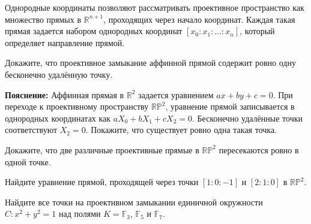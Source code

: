     \begin{statement}
    Однородные координаты позволяют рассматривать проективное пространство как множество прямых в $ \mathbb{R}^{n+1} $, проходящих через начало координат. Каждая такая прямая задается набором однородных координат $ [x_0 : x_1 : \dots : x_n] $, который определяет направление прямой.
    \end{statement}

\begin{task}
    Докажите, что проективное замыкание аффинной прямой содержит ровно одну бесконечно удалённую точку.
    
    \textbf{Пояснение:} 
    Аффинная прямая в $\mathbb{R}^2$ задается уравнением $ax + by + c = 0$. При переходе к проективному пространству $\mathbb{RP}^2$, уравнение прямой записывается в однородных координатах как $aX_0 + bX_1 + cX_2 = 0$. Бесконечно удалённые точки соответствуют $X_2 = 0$. Покажите, что существует ровно одна такая точка.
    \end{task}
    
    \begin{task}
    Докажите, что две различные проективные прямые в $\mathbb{RP}^2$ пересекаются ровно в одной точке.
    \end{task}
    
    \begin{task}
    Найдите уравнение прямой, проходящей через точки $[1 : 0 : -1]$ и $[2 : 1 : 0]$ в $\mathbb{RP}^2$.
    \end{task}
    
    \begin{task}
    Найдите все точки на проективном замыкании единичной окружности $C : x^2 + y^2 = 1$ над полями $K = \mathbb{F}_3$, $\mathbb{F}_5$ и $\mathbb{F}_7$.
    \end{task}